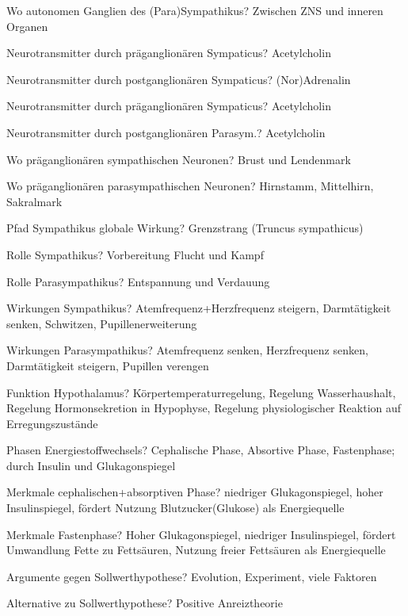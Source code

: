 \documentclass[a4paper]{article}
\begin{document}
\begin{multicols}{3}
  Wo autonomen Ganglien des (Para)Sympathikus? Zwischen ZNS und inneren Organen

  Neurotransmitter durch präganglionären Sympaticus? Acetylcholin

  Neurotransmitter durch postganglionären Sympaticus? (Nor)Adrenalin

  Neurotransmitter durch präganglionären Sympaticus? Acetylcholin

  Neurotransmitter durch postganglionären Parasym.? Acetylcholin

  Wo präganglionären sympathischen Neuronen? Brust und Lendenmark

  Wo präganglionären parasympathischen Neuronen? Hirnstamm, Mittelhirn, Sakralmark

  Pfad Sympathikus globale Wirkung? Grenzstrang (Truncus sympathicus)

  Rolle Sympathikus? Vorbereitung Flucht und Kampf

  Rolle Parasympathikus? Entspannung und Verdauung

  Wirkungen Sympathikus? Atemfrequenz+Herzfrequenz steigern, Darmtätigkeit senken, Schwitzen, Pupillenerweiterung

  Wirkungen Parasympathikus? Atemfrequenz senken, Herzfrequenz senken, Darmtätigkeit steigern, Pupillen verengen

  Funktion Hypothalamus? Körpertemperaturregelung, Regelung Wasserhaushalt, Regelung Hormonsekretion in Hypophyse, Regelung physiologischer Reaktion auf Erregungszustände

  Phasen Energiestoffwechsels? Cephalische Phase, Absortive Phase, Fastenphase; durch Insulin und Glukagonspiegel

  Merkmale cephalischen+absorptiven Phase? niedriger Glukagonspiegel, hoher Insulinspiegel, fördert Nutzung Blutzucker(Glukose) als Energiequelle

  Merkmale Fastenphase? Hoher Glukagonspiegel, niedriger Insulinspiegel, fördert Umwandlung Fette zu Fettsäuren, Nutzung freier Fettsäuren als Energiequelle

  Argumente gegen Sollwerthypothese? Evolution, Experiment, viele Faktoren

  Alternative zu Sollwerthypothese? Positive Anreiztheorie


\end{multicols}
\end{document}
